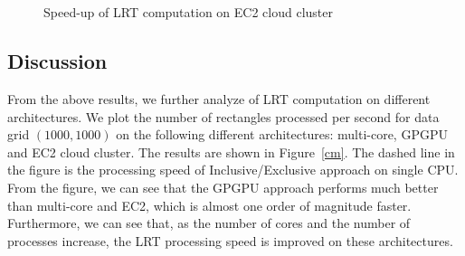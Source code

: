 \documentclass[10pt,journal,cspaper,compsoc]{IEEEtran}
\begin{document}
\begin{figure}[h]
\centering
{}\\
~~
\caption{Speed-up of LRT computation on EC2 cloud cluster }\label{ec2}
\end{figure}

\subsection{Discussion}
From the above results, we further analyze of LRT computation on different architectures. We plot the number of rectangles processed per second for data grid $(1000,1000)$ on the following different architectures: multi-core, GPGPU and EC2 cloud cluster. The results are shown in Figure~\ref{cm}. The dashed line in the figure is the processing speed of Inclusive/Exclusive approach on single CPU. From the figure, we can see that the GPGPU approach performs much better than multi-core and EC2, which is almost one order of magnitude faster. Furthermore, we can see that, as the number of cores and the number of processes increase, the LRT processing speed is improved on these architectures. \\
\end{document}
